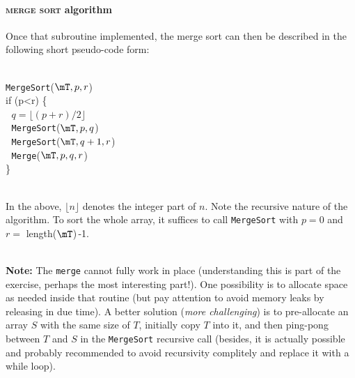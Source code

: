 \documentclass[a4paper,12pt]{article}
\begin{document}
\newpage 
\paragraph{\textsc{merge sort} algorithm} Once that subroutine implemented, the merge sort can then be described in the following short pseudo-code form:

\quad\\
\verb?MergeSort?($\mT,p,r$)\\
if (p<r) \{\\
\textcolor{white}{.}\hspace{0.25cm} $q = \lfloor (p+r)/2\rfloor$\\
\textcolor{white}{.}\hspace{0.25cm} \verb?MergeSort?($\mT,p,q$)\\
\textcolor{white}{.}\hspace{0.25cm} \verb?MergeSort?($\mT,q+1,r$)\\
\textcolor{white}{.}\hspace{0.25cm} \verb?Merge?($\mT,p,q,r$)\\
\}

\quad\\
In the above, $\lfloor n\rfloor$ denotes the integer part of $n$. Note the recursive nature of the algorithm. To sort the whole array, it suffices to call \verb?MergeSort? with $p=0$ and $r = $ \textrm{length}($\mT$)\,-1.

\quad\\
{\bf Note:} The \verb?merge? cannot fully work in place (understanding this is part of the exercise, perhaps the most interesting part!). One possibility is to allocate space as needed inside that routine (but pay attention to avoid memory leaks by releasing in due time). A better solution ({\it more challenging}) is to pre-allocate an array $S$ with the same size of $T$, initially copy $T$ into it, and then ping-pong between $T$ and $S$ in the \verb?MergeSort? recursive call (besides, it is actually possible and probably recommended to avoid recursivity complitely and replace it with a while loop).
\end{document}
